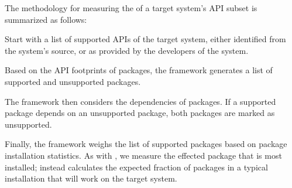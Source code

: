 

The methodology for measuring the \compatmetric{} of a target system's API subset is summarized as follows:
\begin{compactenum}
\item Start with a list of supported APIs of the target system, either identified from the system's source, or as provided by the developers of the system.
\item Based on the API footprints of packages, the framework generates a list of supported and unsupported packages.
\item The framework then considers the dependencies of packages. If a supported package depends on an unsupported package, both packages are marked as unsupported.
\item Finally, the framework weighs the list of supported packages based on package installation statistics.
As with \usagemetric{}, we measure the effected package that is most installed;
\compatmetric{} instead calculates the expected fraction of packages in a typical installation that will work on the target system.
\end{compactenum}


